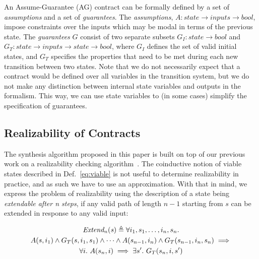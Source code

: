 An Assume-Guarantee (AG) contract can be formally defined by a set of
\emph{assumptions} and a set of \emph{guarantees}. The
\emph{assumptions}, $A: state \rightarrow inputs \rightarrow bool$,
impose constraints over the inputs which may be modal in terms of the
previous state. The \emph{guarantees} $G$ consist of two separate
subsets $G_I: state \rightarrow bool$ and $G_T: state \rightarrow
inputs \rightarrow state \rightarrow bool$, where $G_I$ defines the
set of valid initial states, and $G_T$ specifies the properties that
need to be met during each new transition between two states. Note
that we do not necessarily expect that a contract would be defined
over all variables in the transition system, but we do not make any
distinction between internal state variables and outputs in the
formalism. This way, we can use state variables to (in some cases)
simplify the specification of guarantees.
\fi
\subsection{Realizability of Contracts}
\label{sec:old}

The synthesis algorithm proposed in this paper is built on top of our previous work on a realizability checking algorithm~\cite{gacek2015towards}. The coinductive notion of viable states described in Def.~\ref{eq:viable} is not useful to determine realizability in practice, and as such we have to use an approximation. With that in mind, we express the problem of realizability using the description of a state being \emph{extendable after n steps}, if any valid path of length $n-1$ starting from $s$ can be extended in response to any valid input:

%
\begin{multline}%
\extendable \triangleq \forall i_1, s_1, \ldots, i_n, s_n.\\ A(s, i_1) \land G_T(s, i_1, s_1)
\land \cdots \land
A(s_{n-1}, i_n) \land G_T(s_{n-1}, i_n, s_n)
\implies \\
\forall i.~ A(s_n, i) \implies \exists s'.~ G_T(s_n, i, s')
\label{def:extend}
\end{multline}

